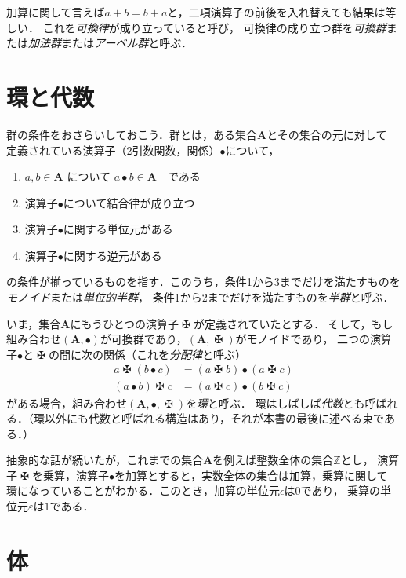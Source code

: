 \documentclass{jsbook}
\newcommand{\keyword}[1]{\emph{#1}}
\newcommand{\bop}[1]{\boldsymbol{#1}}
\newcommand{\bg}[1]{\mathbf{#1}}
\newcommand{\opmaltese}{\mathop{\maltese}}
\begin{document}
加算に関して言えば$a+b=b+a$と，二項演算子の前後を入れ替えても結果は等しい．
これを\keyword{可換律}が成り立っていると呼び，
可換律の成り立つ群を\keyword{可換群}または\keyword{加法群}または\keyword{アーベル群}と呼ぶ．

\section{環と代数}

群の条件をおさらいしておこう．群とは，ある集合$\bg{A}$とその集合の元に対して
定義されている演算子（2引数関数，関係）$\bullet$について，
\begin{enumerate}
\item $a,b\in\bg{A}$ について $a\bullet b\in\bop{A}$　である
\item 演算子$\bullet$について結合律が成り立つ
\item 演算子$\bullet$に関する単位元がある
\item 演算子$\bullet$に関する逆元がある
\end{enumerate}
の条件が揃っているものを指す．このうち，条件1から3までだけを満たすものを\keyword{モノイド}または\keyword{単位的半群}，
条件1から2までだけを満たすものを\keyword{半群}と呼ぶ．

いま，集合$\bg{A}$にもうひとつの演算子$\opmaltese$が定義されていたとする．
そして，もし組み合わせ$(\bg{A},\bullet)$が可換群であり，$(\bg{A},\opmaltese)$がモノイドであり，
二つの演算子$\bullet$と$\opmaltese$の間に次の関係（これを\keyword{分配律}と呼ぶ）
\begin{align}
a\opmaltese(b\bullet c)&=(a\opmaltese b)\bullet(a\opmaltese c)\\
(a\bullet b)\opmaltese c&=(a\opmaltese c)\bullet(b\opmaltese c)
\end{align}
がある場合，組み合わせ$(\bg{A},\bullet,\opmaltese)$を\keyword{環}と呼ぶ．
環はしばしば\keyword{代数}とも呼ばれる．（環以外にも代数と呼ばれる構造はあり，それが本書の最後に述べる束である．）

抽象的な話が続いたが，これまでの集合$\bg{A}$を例えば整数全体の集合$\mathbb{Z}$とし，
演算子$\opmaltese$を乗算，演算子$\bullet$を加算とすると，実数全体の集合は加算，乗算に関して
環になっていることがわかる．このとき，加算の単位元$\epsilon$は$0$であり，
乗算の単位元$\varepsilon$は$1$である．

\section{体}
\end{document}
